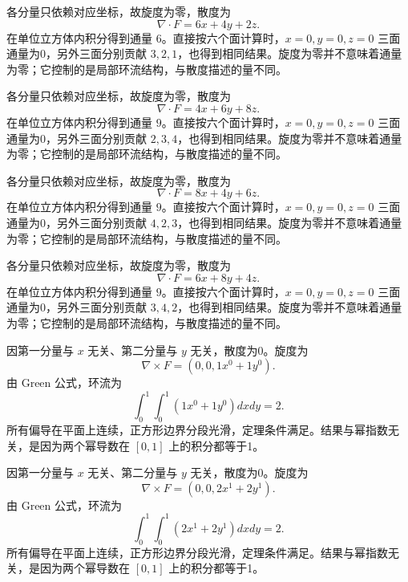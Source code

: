 \documentclass[UTF8,12pt,a4paper,fontset=fandol]{ctexart}
\begin{document}
\begin{solve}\label{ans:c44q3}
各分量只依赖对应坐标，故旋度为零，散度为
\[
\nabla\cdot F=6x+4y+2z.
\]
在单位立方体内积分得到通量 $6$。直接按六个面计算时，$x=0,y=0,z=0$ 三面通量为0，另外三面分别贡献 $3,2,1$，也得到相同结果。旋度为零并不意味着通量为零；它控制的是局部环流结构，与散度描述的量不同。
\end{solve}

\begin{solve}\label{ans:c44q4}
各分量只依赖对应坐标，故旋度为零，散度为
\[
\nabla\cdot F=4x+6y+8z.
\]
在单位立方体内积分得到通量 $9$。直接按六个面计算时，$x=0,y=0,z=0$ 三面通量为0，另外三面分别贡献 $2,3,4$，也得到相同结果。旋度为零并不意味着通量为零；它控制的是局部环流结构，与散度描述的量不同。
\end{solve}

\begin{solve}\label{ans:c44q5}
各分量只依赖对应坐标，故旋度为零，散度为
\[
\nabla\cdot F=8x+4y+6z.
\]
在单位立方体内积分得到通量 $9$。直接按六个面计算时，$x=0,y=0,z=0$ 三面通量为0，另外三面分别贡献 $4,2,3$，也得到相同结果。旋度为零并不意味着通量为零；它控制的是局部环流结构，与散度描述的量不同。
\end{solve}

\begin{solve}\label{ans:c44q6}
各分量只依赖对应坐标，故旋度为零，散度为
\[
\nabla\cdot F=6x+8y+4z.
\]
在单位立方体内积分得到通量 $9$。直接按六个面计算时，$x=0,y=0,z=0$ 三面通量为0，另外三面分别贡献 $3,4,2$，也得到相同结果。旋度为零并不意味着通量为零；它控制的是局部环流结构，与散度描述的量不同。
\end{solve}

\begin{solve}\label{ans:c44q7}
因第一分量与 $x$ 无关、第二分量与 $y$ 无关，散度为0。旋度为
\[
\nabla\times F=(0,0,1x^{0}+1y^{0}).
\]
由 Green 公式，环流为
\[
\int_0^1\int_0^1(1x^{0}+1y^{0})dxdy=2.
\]
所有偏导在平面上连续，正方形边界分段光滑，定理条件满足。结果与幂指数无关，是因为两个幂导数在 $[0,1]$ 上的积分都等于1。
\end{solve}

\begin{solve}\label{ans:c44q8}
因第一分量与 $x$ 无关、第二分量与 $y$ 无关，散度为0。旋度为
\[
\nabla\times F=(0,0,2x^{1}+2y^{1}).
\]
由 Green 公式，环流为
\[
\int_0^1\int_0^1(2x^{1}+2y^{1})dxdy=2.
\]
所有偏导在平面上连续，正方形边界分段光滑，定理条件满足。结果与幂指数无关，是因为两个幂导数在 $[0,1]$ 上的积分都等于1。
\end{solve}
\end{document}
